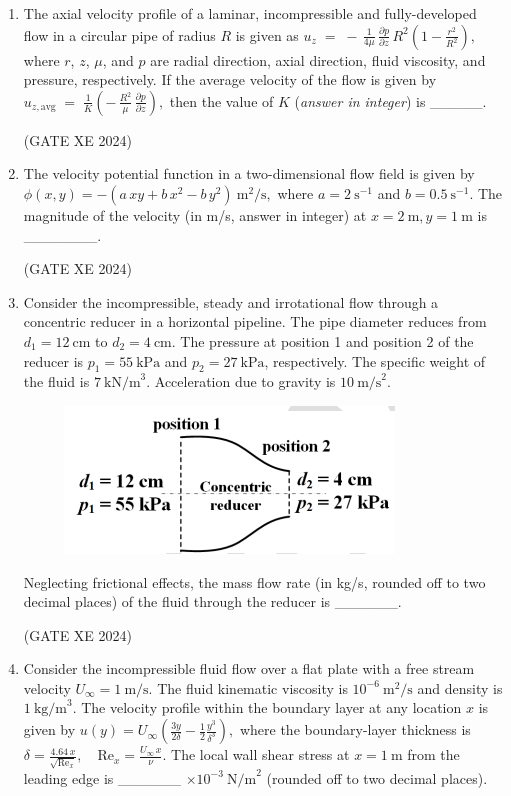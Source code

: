 \documentclass[12pt]{article}
\begin{document}
\begin{enumerate}
\item The axial velocity profile of a laminar, incompressible and fully-developed flow in a circular pipe of radius $R$ is given as
$
u_z \;=\; -\,\frac{1}{4\mu}\,\frac{\partial p}{\partial z}\,R^2\left(1-\frac{r^2}{R^2}\right),
$
where $r$, $z$, $\mu$, and $p$ are radial direction, axial direction, fluid viscosity, and pressure, respectively. If the average velocity of the flow is given by
$
u_{z,\mathrm{avg}} \;=\; \frac{1}{K}\left(-\,\frac{R^2}{\mu}\,\frac{\partial p}{\partial z}\right),
$
then the value of $K$ (\emph{answer in integer}) is \_\_\_\_\_. 

(GATE XE 2024)

\item The velocity potential function in a two-dimensional flow field is given by  
$
\phi(x,y)=-(a\,xy+b\,x^{2}-b\,y^{2})\ \text{m}^2/\text{s},
$
where $a=2\ \text{s}^{-1}$ and $b=0.5\ \text{s}^{-1}$. The magnitude of the velocity (in m/s, answer in integer) at $x=2\ \text{m}, y=1\ \text{m}$ is \_\_\_\_\_\_\_.  

(GATE XE 2024)

\item Consider the incompressible, steady and irrotational flow through a concentric reducer in a horizontal pipeline. The pipe diameter reduces from $d_1=12\ \text{cm}$ to $d_2=4\ \text{cm}$. The pressure at position 1 and position 2 of the reducer is $p_1=55\ \text{kPa}$ and $p_2=27\ \text{kPa}$, respectively. The specific weight of the fluid is $7\ \text{kN/m}^3$. Acceleration due to gravity is $10\ \text{m/s}^2$.

\begin{figure}[H]
    \centering
    \includegraphics[width=0.5\columnwidth]{figs/ass5_b_q42.png}
    \caption{}
    \label{fig:placeholder}
\end{figure}

Neglecting frictional effects, the mass flow rate (in kg/s, rounded off to two decimal places) of the fluid through the reducer is \_\_\_\_\_\_.  

(GATE XE 2024)

\item Consider the incompressible fluid flow over a flat plate with a free stream velocity $U_\infty = 1\ \text{m/s}$. The fluid kinematic viscosity is $10^{-6}\ \text{m}^2/\text{s}$ and density is $1\ \text{kg/m}^3$. The velocity profile within the boundary layer at any location $x$ is given by  
$
u(y)=U_\infty\left(\frac{3y}{2\delta} - \frac{1}{2}\frac{y^{3}}{\delta^{3}}\right),
$
where the boundary-layer thickness is  
$
\delta = \frac{4.64\,x}{\sqrt{\mathrm{Re}_x}}, \quad \mathrm{Re}_x = \frac{U_\infty\,x}{\nu}.
$
The local wall shear stress at $x=1\ \mathrm{m}$ from the leading edge is \_\_\_\_\_\_ $\times 10^{-3}\ \mathrm{N/m}^2$ (rounded off to two decimal places).  


\end{enumerate}
\end{document}
